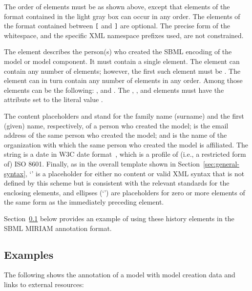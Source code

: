 The order of elements must be as shown above, except that elements
of the format contained in the light gray box can occur in any
order.  The elements of the format contained between \texttt{[}
and \texttt{]} are optional.  The precise form of the whitespace,
and the specific XML namespace prefixes used, are not constrained.

The  element describes the person(s) who created
the SBML encoding of the model or model component.  It must
contain a single  element.  The 
element can contain any number of elements; however, the first
such element must be .  The  element
can in turn contain any number of elements in any order.  Among
those elements can be the following: ,
 and .  The ,
, and  elements
must have the attribute  set to the literal
value .

The content placeholders \familyName and \givenName stand for the
family name (surname) and the first (given) name, respectively, of
a person who created the model; \emailAddress is the email address
of the same person who created the model; and \orgName is the name
of the organization with which the same person who created the
model is affiliated.  The string \historyDate is a date in W3C
date format~\citep{wolf:1998}, which is a profile of (i.e., a
restricted form of) ISO 8601.  Finally, as in the overall template
shown in Section~\ref{sec:general-syntax}, `\otherContent' is
a placeholder for either no content or valid XML syntax that is
not defined by this scheme but is consistent with the relevant
standards for the enclosing elements, and ellipses
(`\moreOfTheSame') are placeholders for zero or more elements of
the same form as the immediately preceding element.

Section~\ref{sec:annotation-examples} below provides an example of
using these history elements in the SBML MIRIAM annotation format.


\subsection{Examples}
\label{sec:annotation-examples}

The following shows the annotation of a model with model creation
data and links to external resources:

